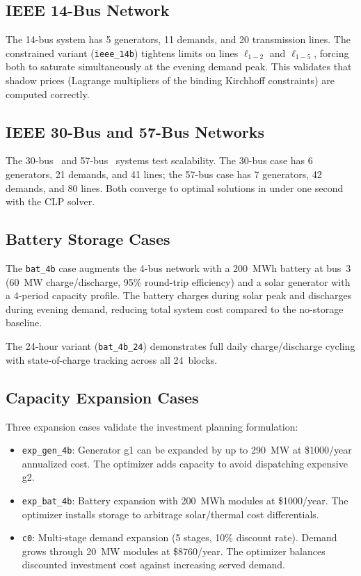 \subsection{IEEE 14-Bus Network}
\label{sec:ieee14b}

The 14-bus system has 5 generators, 11 demands, and 20 transmission lines.
The constrained variant (\texttt{ieee\_14b}) tightens limits on lines
$\ell_{1-2}$ and $\ell_{1-5}$, forcing both to saturate simultaneously
at the evening demand peak.  This validates that shadow prices (Lagrange
multipliers of the binding Kirchhoff constraints) are computed correctly.

\subsection{IEEE 30-Bus and 57-Bus Networks}

The 30-bus~\cite{ieee30bus} and 57-bus~\cite{ieee57bus} systems test
scalability.  The 30-bus case has 6 generators, 21 demands, and 41 lines;
the 57-bus case has 7 generators, 42 demands, and 80 lines.  Both
converge to optimal solutions in under one second with the CLP solver.

\subsection{Battery Storage Cases}
\label{sec:bat_cases}

The \texttt{bat\_4b} case augments the 4-bus network with a 200~MWh
battery at bus~3 (60~MW charge/discharge, 95\% round-trip efficiency) and
a solar generator with a 4-period capacity profile.  The battery charges
during solar peak and discharges during evening demand, reducing total
system cost compared to the no-storage baseline.

The 24-hour variant (\texttt{bat\_4b\_24}) demonstrates full daily
charge/discharge cycling with state-of-charge tracking across all
24~blocks.

\subsection{Capacity Expansion Cases}
\label{sec:exp_cases}

Three expansion cases validate the investment planning formulation:

\begin{itemize}
  \item \texttt{exp\_gen\_4b}: Generator g1 can be expanded by up to
    290~MW at \$1000/year annualized cost.  The optimizer adds capacity
    to avoid dispatching expensive g2.
  \item \texttt{exp\_bat\_4b}: Battery expansion with 200~MWh modules
    at \$1000/year.  The optimizer installs storage to arbitrage
    solar/thermal cost differentials.
  \item \texttt{c0}: Multi-stage demand expansion (5 stages, 10\%
    discount rate).  Demand grows through 20~MW modules at
    \$8760/year.  The optimizer balances discounted investment cost
    against increasing served demand.
\end{itemize}

